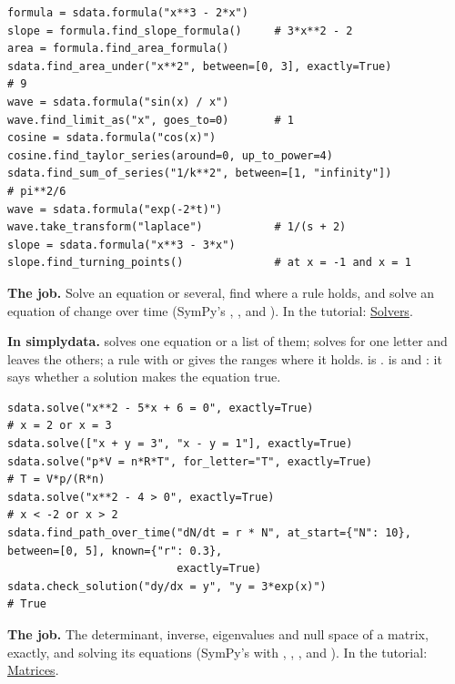 \begin{lstlisting}[style=py]
formula = sdata.formula("x**3 - 2*x")
slope = formula.find_slope_formula()     # 3*x**2 - 2
area = formula.find_area_formula()
sdata.find_area_under("x**2", between=[0, 3], exactly=True)            # 9
wave = sdata.formula("sin(x) / x")
wave.find_limit_as("x", goes_to=0)       # 1
cosine = sdata.formula("cos(x)")
cosine.find_taylor_series(around=0, up_to_power=4)
sdata.find_sum_of_series("1/k**2", between=[1, "infinity"])            # pi**2/6
wave = sdata.formula("exp(-2*t)")
wave.take_transform("laplace")           # 1/(s + 2)
slope = sdata.formula("x**3 - 3*x")
slope.find_turning_points()              # at x = -1 and x = 1
\end{lstlisting}


\textbf{The job.} Solve an equation or several, find where a rule holds, and solve an equation of
change over time (SymPy's , ,  and ). In the
tutorial: \href{https://docs.sympy.org/latest/tutorials/intro-tutorial/solvers.html}{Solvers}.

\textbf{In simplydata.}  solves one equation or a list of them;
 solves for one letter and leaves the others; a rule with \code{<} or \code{>} gives
the ranges where it holds.  is .
 is  and : it says whether a solution makes the
equation true.

\begin{lstlisting}[style=py]
sdata.solve("x**2 - 5*x + 6 = 0", exactly=True)                        # x = 2 or x = 3
sdata.solve(["x + y = 3", "x - y = 1"], exactly=True)
sdata.solve("p*V = n*R*T", for_letter="T", exactly=True)               # T = V*p/(R*n)
sdata.solve("x**2 - 4 > 0", exactly=True)                              # x < -2 or x > 2
sdata.find_path_over_time("dN/dt = r * N", at_start={"N": 10}, between=[0, 5], known={"r": 0.3},
                          exactly=True)
sdata.check_solution("dy/dx = y", "y = 3*exp(x)")                      # True
\end{lstlisting}


\textbf{The job.} The determinant, inverse, eigenvalues and null space of a matrix, exactly, and
solving its equations (SymPy's  with , , ,
 and ). In the tutorial:
\href{https://docs.sympy.org/latest/tutorials/intro-tutorial/matrices.html}{Matrices}.

